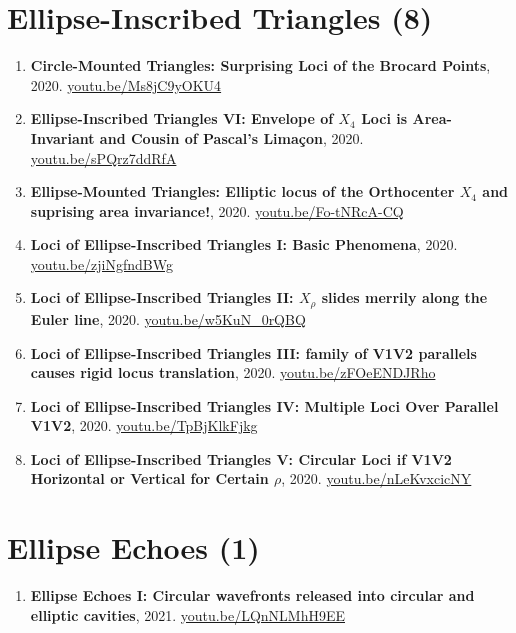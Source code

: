 \documentclass[12pt]{article}
\begin{document}
\section{Ellipse-Inscribed Triangles (8)}

\begin{enumerate}[resume]
\item \textbf{Circle-Mounted Triangles: Surprising Loci of the Brocard Points}, 2020. \href{https://youtu.be/Ms8jC9yOKU4}{\url{youtu.be/Ms8jC9yOKU4}}
\item \textbf{Ellipse-Inscribed Triangles VI: Envelope of $X_{4}$ Loci is Area-Invariant and Cousin of Pascal's Limaçon}, 2020. \href{https://youtu.be/sPQrz7ddRfA}{\url{youtu.be/sPQrz7ddRfA}}
\item \textbf{Ellipse-Mounted Triangles: Elliptic locus of the Orthocenter $X_{4}$ and suprising area invariance!}, 2020. \href{https://youtu.be/Fo-tNRcA-CQ}{\url{youtu.be/Fo-tNRcA-CQ}}
\item \textbf{Loci of Ellipse-Inscribed Triangles I: Basic Phenomena}, 2020. \href{https://youtu.be/zjiNgfndBWg}{\url{youtu.be/zjiNgfndBWg}}
\item \textbf{Loci of Ellipse-Inscribed Triangles II: $X_\rho$ slides merrily along the Euler line}, 2020. \href{https://youtu.be/w5KuN_0rQBQ}{\url{youtu.be/w5KuN\_0rQBQ}}
\item \textbf{Loci of Ellipse-Inscribed Triangles III: family of V1V2 parallels causes rigid locus translation}, 2020. \href{https://youtu.be/zFOeENDJRho}{\url{youtu.be/zFOeENDJRho}}
\item \textbf{Loci of Ellipse-Inscribed Triangles IV: Multiple Loci Over Parallel V1V2}, 2020. \href{https://youtu.be/TpBjKlkFjkg}{\url{youtu.be/TpBjKlkFjkg}}
\item \textbf{Loci of Ellipse-Inscribed Triangles V: Circular Loci if V1V2 Horizontal or Vertical for Certain $\rho$}, 2020. \href{https://youtu.be/nLeKvxcicNY}{\url{youtu.be/nLeKvxcicNY}}
\end{enumerate}

\section{Ellipse Echoes (1)}

\begin{enumerate}[resume]
\item \textbf{Ellipse Echoes I: Circular wavefronts released into circular and elliptic cavities}, 2021. \href{https://youtu.be/LQnNLMhH9EE}{\url{youtu.be/LQnNLMhH9EE}}
\end{enumerate}
\end{document}
